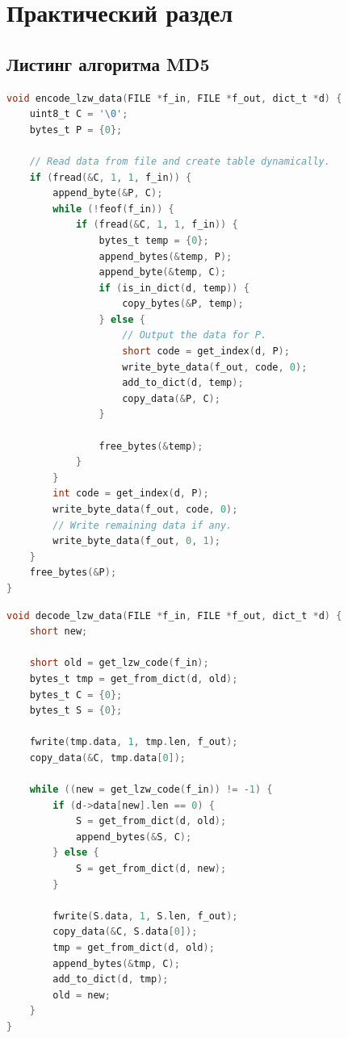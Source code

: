 \chapter{Практический раздел}

\section{Листинг алгоритма MD5}

\begin{lstlisting}[language=C, label=lst:md5, caption={Реализация алгоритма LZW на сжатие}]
void encode_lzw_data(FILE *f_in, FILE *f_out, dict_t *d) {
    uint8_t C = '\0';
    bytes_t P = {0};

    // Read data from file and create table dynamically.
    if (fread(&C, 1, 1, f_in)) {
        append_byte(&P, C);
        while (!feof(f_in)) {
            if (fread(&C, 1, 1, f_in)) {
                bytes_t temp = {0};
                append_bytes(&temp, P);
                append_byte(&temp, C);
                if (is_in_dict(d, temp)) {
                    copy_bytes(&P, temp);
                } else {
                    // Output the data for P.
                    short code = get_index(d, P);
                    write_byte_data(f_out, code, 0);
                    add_to_dict(d, temp);
                    copy_data(&P, C);
                }

                free_bytes(&temp);
            }
        }
        int code = get_index(d, P);
        write_byte_data(f_out, code, 0);
        // Write remaining data if any.
        write_byte_data(f_out, 0, 1);
    }
    free_bytes(&P);
}
\end{lstlisting}

\newpage

\begin{lstlisting}[language=C, label=lst:rsa, caption={Реализация алгоритма LZW на распаковку}]
void decode_lzw_data(FILE *f_in, FILE *f_out, dict_t *d) {
    short new;

    short old = get_lzw_code(f_in);
    bytes_t tmp = get_from_dict(d, old);
    bytes_t C = {0};
    bytes_t S = {0};

    fwrite(tmp.data, 1, tmp.len, f_out);
    copy_data(&C, tmp.data[0]);

    while ((new = get_lzw_code(f_in)) != -1) {
        if (d->data[new].len == 0) {
            S = get_from_dict(d, old);
            append_bytes(&S, C);
        } else {
            S = get_from_dict(d, new);
        }

        fwrite(S.data, 1, S.len, f_out);
        copy_data(&C, S.data[0]);
        tmp = get_from_dict(d, old);
        append_bytes(&tmp, C);
        add_to_dict(d, tmp);
        old = new;
    }
}
\end{lstlisting}

